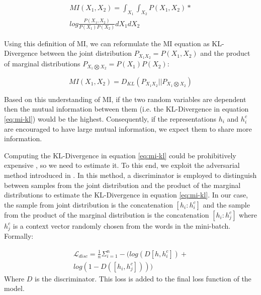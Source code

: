 \documentclass[11pt,a4paper]{article}
\begin{document}
\begin{equation}
\begin{split}
    MI(X_1,X_2) = \int_{X_1} \int_{X_2} P(X_1,X_2) * \\ log \frac{P(X_1,X_2)}{P(X_1)P(X_2)} dX_1dX_2
\end{split}
\end{equation}

Using this definition of MI, we can reformulate the MI equation as KL-Divergence between the joint distribution $P_{X_1X_2}=P(X_1,X_2)$ and the product of marginal distributions $P_{X_1\bigotimes X_2}=P(X_1)P(X_2)$:

\begin{equation}
    \label{eq:mi-kl}
    MI(X_1,X_2) = D_{KL}(P_{X_1X_2}||P_{X_1\bigotimes X_2})
\end{equation}

 Based on this understanding of MI, if the two random variables are dependent then the mutual information between them (i.e. the KL-Divergence in equation \ref{eq:mi-kl}) would be the highest. Consequently, if the representations $h_i$ and $h^c_i$ are encouraged to have large mutual information, we expect them to share more information.
 
 Computing the KL-Divergence in equation \ref{eq:mi-kl} could be prohibitively expensive \cite{belghazi:18}, so we need to estimate it. To this end, we exploit the adversarial method introduced in \cite{hjelm:19}. In this method, a discriminator is employed to distinguish between samples from the joint distribution and the product of the marginal distributions to estimate the KL-Divergence in equation \ref{eq:mi-kl}. In our case, the sample from joint distribution is the concatenation $[h_i:h_i^c]$ and the sample from the product of the marginal distribution is the concatenation $[h_i:h_j^c]$ where $h_j^c$ is a context vector randomly chosen from the words in the mini-batch. Formally:
 
\begin{equation}
\label{eq:disc}
\begin{split}
    \mathcal{L}_{disc} = \frac{1}{n}\Sigma_{i=1}^n  -(log(D[h,h^c_i])+ \\ log(1-D([h_i,h^c_j])))
\end{split}
\end{equation} 
Where $D$ is the discriminator. This loss is added to the final loss function of the model.
\end{document}
